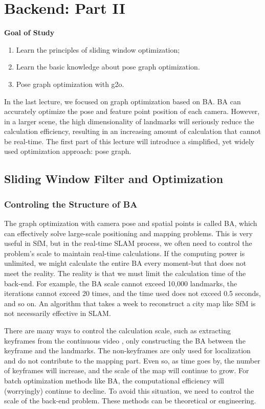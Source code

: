 \chapter{Backend: Part II}
\label{cpt:backend2}
\begin{mdframed}  
	\textbf{Goal of Study}
	\begin{enumerate}[labelindent=0em,leftmargin=1.5em]
		\item Learn the principles of sliding window optimization; 
		\item Learn the basic knowledge about pose graph optimization.
		\item Pose graph optimization with g2o. 
	\end{enumerate}
\end{mdframed}

In the last lecture, we focused on graph optimization based on BA. BA can accurately optimize the pose and feature point position of each camera. However, in a larger scene, the high dimensionality of landmarks will seriously reduce the calculation efficiency, resulting in an increasing amount of calculation that cannot be real-time. The first part of this lecture will introduce a simplified, yet widely used optimization approach: pose graph.

\newpage
\section{Sliding Window Filter and Optimization}
\subsection{Controling the Structure of BA}

The graph optimization with camera pose and spatial points is called BA, which can effectively solve large-scale positioning and mapping problems. This is very useful in SfM, but in the real-time SLAM process, we often need to control the problem's scale to maintain real-time calculations. If the computing power is unlimited, we might calculate the entire BA every moment-but that does not meet the reality. The reality is that we must limit the calculation time of the back-end. For example, the BA scale cannot exceed 10,000 landmarks, the iterations cannot exceed 20 times, and the time used does not exceed 0.5 seconds, and so on. An algorithm that takes a week to reconstruct a city map like SfM is not necessarily effective in SLAM.

There are many ways to control the calculation scale, such as extracting keyframes from the continuous video \cite{Leutenegger2015}, only constructing the BA between the keyframe and the landmarks. The non-keyframes are only used for localization and do not contribute to the mapping part. Even so, as time goes by, the number of keyframes will increase, and the scale of the map will continue to grow. For batch optimization methods like BA, the computational efficiency will (worryingly) continue to decline. To avoid this situation, we need to control the scale of the back-end problem. These methods can be theoretical or engineering.

